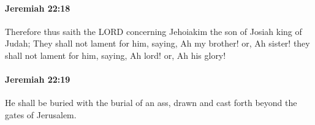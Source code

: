 		\paragraph{Jeremiah 22:18} %
			\label{JEREMIAH-22-18}

			Therefore thus saith the LORD concerning Jehoiakim the son of Josiah king of Judah; They shall not lament for him, saying, Ah my brother! or, Ah sister! they shall not lament for him, saying, Ah lord! or, Ah his glory!


		\paragraph{Jeremiah 22:19} %
			\label{JEREMIAH-22-19}

			He shall be buried with the burial of an ass, drawn and cast forth beyond the gates of Jerusalem.


